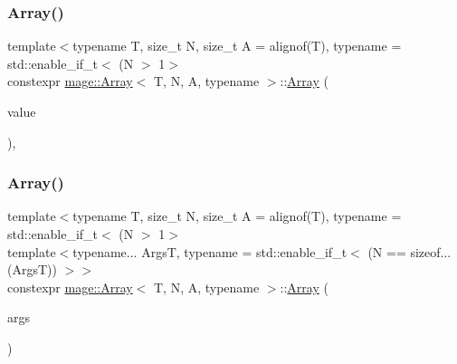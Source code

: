 \mbox{\label{structmage_1_1_array_a1f206f942c1318eb7f57c7e0666bc923}} 
\subsubsection{\texorpdfstring{Array()}{Array()}\hspace{0.1cm}{\footnotesize\ttfamily [2/10]}}
{\footnotesize\ttfamily template$<$typename T, size\+\_\+t N, size\+\_\+t A = alignof(\+T), typename  = std\+::enable\+\_\+if\+\_\+t$<$ (\+N $>$ 1$>$ \\
constexpr \mbox{\hyperlink{structmage_1_1_array}{mage\+::\+Array}}$<$ T, N, A, typename $>$\+::\mbox{\hyperlink{structmage_1_1_array}{Array}} (\begin{DoxyParamCaption}\item[{const T \&}]{value }\end{DoxyParamCaption})\hspace{0.3cm}{\ttfamily [explicit]}, {\ttfamily [noexcept]}}

\mbox{\label{structmage_1_1_array_ab6dbce28b41b7ef1e9c0195f24f378a6}} 
\subsubsection{\texorpdfstring{Array()}{Array()}\hspace{0.1cm}{\footnotesize\ttfamily [3/10]}}
{\footnotesize\ttfamily template$<$typename T, size\+\_\+t N, size\+\_\+t A = alignof(\+T), typename  = std\+::enable\+\_\+if\+\_\+t$<$ (\+N $>$ 1$>$ \\
template$<$typename... ArgsT, typename  = std\+::enable\+\_\+if\+\_\+t$<$ (\+N == sizeof...(\+Args\+T)) $>$$>$ \\
constexpr \mbox{\hyperlink{structmage_1_1_array}{mage\+::\+Array}}$<$ T, N, A, typename $>$\+::\mbox{\hyperlink{structmage_1_1_array}{Array}} (\begin{DoxyParamCaption}\item[{ArgsT \&\&...}]{args }\end{DoxyParamCaption})\hspace{0.3cm}{\ttfamily [noexcept]}}

\mbox{\label{structmage_1_1_array_a1e0a4b5cebb34709b32bc13e9ab917e1}} 
